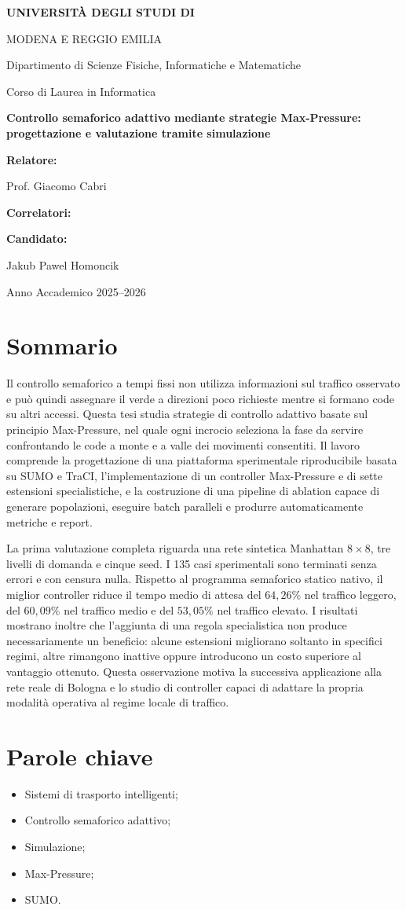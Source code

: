 \documentclass[12pt,a4paper,oneside]{report}
\numberwithin{equation}{chapter}
\newcommand{\TesiTitolo}{Controllo semaforico adattivo mediante strategie Max-Pressure: progettazione e valutazione tramite simulazione}
\newcommand{\TesiCandidato}{Jakub Pawel Homoncik}
\newcommand{\TesiRelatore}{Prof. Giacomo Cabri}
\newcommand{\TesiCorrelatori}{}
\newcommand{\TesiAnnoAccademico}{2025--2026}
\newcommand{\frontespizio}{
    \begin{titlepage}
        \thispagestyle{empty}
        \centering

        {\Large\bfseries
        UNIVERSITÀ DEGLI STUDI DI\par
        MODENA E REGGIO EMILIA
        \par}

        \vspace{1cm}

        {\large
        Dipartimento di Scienze Fisiche, Informatiche e Matematiche
        \par}

        \vspace{0.5cm}

        {\large
        Corso di Laurea in Informatica
        \par}

        \vfill

        {\LARGE\bfseries
        \TesiTitolo
        \par}

        \vfill

        \begin{minipage}[t]{0.45\textwidth}
            \raggedright
            \textbf{Relatore:}\par\vspace{0.2cm}
            \TesiRelatore

            \ifdefempty{\TesiCorrelatori}
            {}
            {
                \par\vspace{0.8cm}
                \textbf{Correlatori:}\par\vspace{0.2cm}
                \TesiCorrelatori
            }
        \end{minipage}
        \hfill
        \begin{minipage}[t]{0.45\textwidth}
            \raggedleft
            \textbf{Candidato:}\par\vspace{0.2cm}
            \TesiCandidato
        \end{minipage}

        \vfill

        {\large
        Anno Accademico \TesiAnnoAccademico
        \par}

    \end{titlepage}

    \cleardoublepage
}
\begin{document}
\hypersetup{pageanchor=false}
\frontespizio
\hypersetup{pageanchor=true}

\chapter*{Sommario}

Il controllo semaforico a tempi fissi non utilizza informazioni sul traffico
osservato e può quindi assegnare il verde a direzioni poco richieste mentre si
formano code su altri accessi. Questa tesi studia strategie di controllo
adattivo basate sul principio Max-Pressure, nel quale ogni incrocio seleziona
la fase da servire confrontando le code a monte e a valle dei movimenti
consentiti. Il lavoro comprende la progettazione di una piattaforma
sperimentale riproducibile basata su SUMO e TraCI, l'implementazione di un
controller Max-Pressure e di sette estensioni specialistiche, e la costruzione
di una pipeline di ablation capace di generare popolazioni, eseguire batch
paralleli e produrre automaticamente metriche e report.

La prima valutazione completa riguarda una rete sintetica Manhattan \(8
\times 8\), tre livelli di domanda e cinque seed. I 135 casi sperimentali sono
terminati senza errori e con censura nulla. Rispetto al programma semaforico
statico nativo, il miglior controller riduce il tempo medio di attesa del
\(64{,}26\%\) nel traffico leggero, del \(60{,}09\%\) nel traffico medio e del
\(53{,}05\%\) nel traffico elevato. I risultati mostrano inoltre che
l'aggiunta di una regola specialistica non produce necessariamente un
beneficio: alcune estensioni migliorano soltanto in specifici regimi, altre
rimangono inattive oppure introducono un costo superiore al vantaggio
ottenuto. Questa osservazione motiva la successiva applicazione alla rete
reale di Bologna e lo studio di controller capaci di adattare la propria
modalità operativa al regime locale di traffico.

\chapter*{Parole chiave}

\begin{itemize}
    \item Sistemi di trasporto intelligenti;
    \item Controllo semaforico adattivo;
    \item Simulazione;
    \item Max-Pressure;
    \item SUMO.
\end{itemize}
\end{document}
